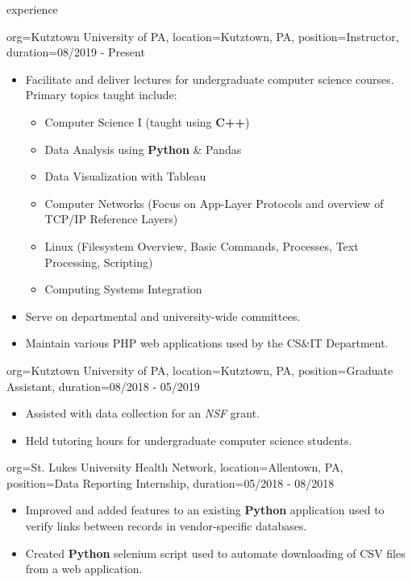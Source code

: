 \documentclass{resume}
\begin{document}
\makeheader

\begin{ResumeSection}{experience}
    \begin{ResumeSubsection}{org={Kutztown University of PA}, location={Kutztown, PA}, position={Instructor}, duration={08/2019 - Present}}
        \begin{itemize}
            \item Facilitate and deliver lectures for undergraduate computer science courses. Primary topics taught include: 
            \begin{itemize}
                \item Computer Science I (taught using \textbf{C++})
                \item Data Analysis using \textbf{Python} \& Pandas
                \item Data Visualization with Tableau
                \item Computer Networks (Focus on App-Layer Protocols and overview of TCP/IP Reference Layers)
                \item Linux (Filesystem Overview, Basic Commands, Processes, Text Processing, Scripting)
                \item Computing Systems Integration
            \end{itemize}
            \item Serve on departmental and university-wide committees.
            \item Maintain various PHP web applications used by the CS\&IT Department.
        \end{itemize}
    \end{ResumeSubsection}    
    \begin{ResumeSubsection}{org={Kutztown University of PA}, location={Kutztown, PA}, position={Graduate Assistant}, duration={08/2018 - 05/2019}}
        \begin{itemize}
            \item Assisted with data collection for an \emph{NSF} grant.
            \item Held tutoring hours for undergraduate computer science students. 
        \end{itemize}
    \end{ResumeSubsection}
    \begin{ResumeSubsection}{org={St. Lukes University Health Network}, location={Allentown, PA}, position={Data Reporting Internship}, duration={05/2018 - 08/2018}}
        \begin{itemize}
            \item Improved and added features to an existing \textbf{Python} application used to verify links between records in vendor-specific databases. 
            \item Created \textbf{Python} selenium script used to automate downloading of CSV files from a web application.
        \end{itemize}
    \end{ResumeSubsection}
\end{ResumeSection}
\end{document}
